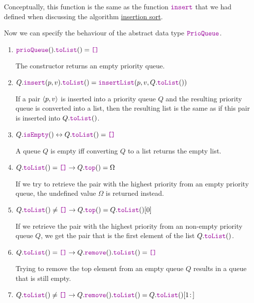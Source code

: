 \begin{Definition}
\begin{enumerate}
\begin{enumerate}
\begin{enumerate}
            \end{enumerate}
            Conceptually, this function is the same as the function $\mytt{insert}$ that we had defined when
            discussing the algorithm \hyperref[sec:insertionSort]{insertion sort}.
      \end{enumerate}
      Now we can specify the behaviour of the abstract data type $\mytt{PrioQueue}$.
      \begin{enumerate}
      \item $\mytt{prioQueue}().\mytt{toList}() = \mytt{[]}$

            The constructor returns an empty priority queue.
      \item $Q.\mytt{insert}(p,v).\mytt{toList}() = \mytt{insertList}(p,v,Q.\mytt{toList}())$

            If a pair $\pair(p,v)$ is inserted into a priority queue $Q$ and the resulting priority queue is
            converted into a list, then the resulting list is the same as if this pair is inserted
            into $Q.\mytt{toList}()$.
      \item $Q.\mytt{isEmpty}() \leftrightarrow Q.\mytt{toList}() = \mytt{[]}$

            A queue $Q$ is empty iff converting $Q$ to a list returns the empty list.
      \item $Q.\mytt{toList}() = \mytt{[]} \rightarrow Q.\mytt{top}() = \Omega$

            If we try to retrieve the pair with the highest priority from an empty priority queue, the
            undefined value $\Omega$ is returned instead.
      \item $Q.\mytt{toList}() \not= \mytt{[]} \rightarrow Q.\mytt{top}() = Q.\mytt{toList}()[0]$

            If we retrieve the  pair with the highest priority from an non-empty priority queue $Q$,
            we get the pair that is the first element of the list $Q.\mytt{toList}()$.

      \item $Q.\mytt{toList}() = \mytt{[]} \rightarrow Q.\mytt{remove}().\mytt{toList}() = \mytt{[]}$

            Trying to remove the top element from an empty queue $Q$ results in a queue that is still empty.
      \item $Q.\mytt{toList}() \not= \mytt{[]} \rightarrow Q.\mytt{remove}().\mytt{toList}() =
        Q.\mytt{toList}()[1\!:\,]$


\end{enumerate}
\end{enumerate}
\end{Definition}
